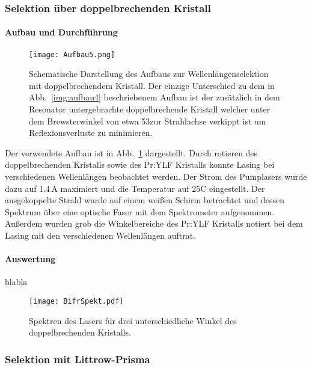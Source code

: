 \subsubsection{Selektion über doppelbrechenden Kristall}


\paragraph{Aufbau und Durchführung}


\begin{figure}[H]
\begin{center}
  \texttt{[image: Aufbau5.png]}
  \caption{Schematische Darstellung des Aufbaus zur Wellenlängenselektion mit doppelbrechendem Kristall. Der einzige Unterschied zu dem in Abb.~\ref{img:aufbau4} beschriebenem Aufbau ist der zusätzlich in dem Resonator untergebrachte doppelbrechende Kristall welcher unter dem Brewsterwinkel von etwa 53\grad zur Strahlachse verkippt ist um Reflexionsverluste zu minimieren.}
  \label{img:aufbau5}
\end{center}
\end{figure}

Der verwendete Aufbau ist in Abb.~\ref{img:aufbau5} dargestellt.
Durch rotieren des doppelbrechenden Kristalls sowie des Pr:YLF Kristalls konnte Lasing bei verschiedenen Wellenlängen beobachtet werden. Der Strom des Pumplasers wurde dazu auf 1.4\,A maximiert und die Temperatur auf 25\grad C eingestellt. Der ausgekoppelte Strahl wurde auf einem weißen Schirm betrachtet und dessen Spektrum über eine optische Faser mit dem Spektrometer aufgenommen. Außerdem wurden grob die Winkelbereiche des Pr:YLF Kristalls notiert bei dem Lasing mit den verschiedenen Wellenlängen auftrat.




\paragraph{Auswertung}
blabla

\begin{figure}[H]
\begin{center}
  \texttt{[image: BifrSpekt.pdf]}
  \caption{Spektren des Lasers für drei unterschiedliche Winkel des doppelbrechenden Kristalls.}
  \label{img:BifrSpekt}
\end{center}
\end{figure}

\subsubsection{Selektion mit Littrow-Prisma}

